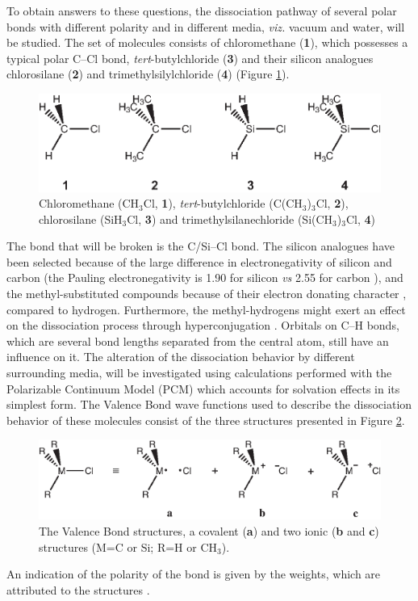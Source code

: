 To obtain answers to these questions, the dissociation pathway of several polar bonds with different polarity and in different media, \textit{viz.} vacuum and water, will be studied.  The set of molecules consists of chloromethane (\textbf{1}), which possesses a typical polar C--Cl bond, \textit{tert}-butylchloride (\textbf{3}) and their silicon analogues chlorosilane (\textbf{2}) and trimethylsilylchloride (\textbf{4}) (Figure \ref{ch3.fig.compounds}).  
\begin{figure}[htbp]
\begin{center}
\includegraphics{dissociation/figures/compounds.eps}
\end{center}
\caption{Chloromethane (CH$_3$Cl, \textbf{1}), \textit{tert}-butylchloride
(C(CH$_3$)$_3$Cl, \textbf{2}), chlorosilane (SiH$_3$Cl, \textbf{3}) and trimethylsilanechloride
(Si(CH$_3$)$_3$Cl, \textbf{4})}
\label{ch3.fig.compounds}
\end{figure} 
The bond that will be broken is the C/Si--Cl bond.  The silicon analogues have been selected because of the large difference in electronegativity of silicon and carbon (the Pauling electronegativity is 1.90 for silicon \textit{vs} 2.55 for carbon \cite{handbook}), and the methyl-substituted compounds because of their electron donating character \cite{mcmurry}, compared to hydrogen. Furthermore, the methyl-hydrogens might exert an effect on the dissociation process through hyperconjugation \cite{march}. Orbitals on C--H bonds, which are several bond lengths separated from the central atom, still have an influence on it. The alteration of the dissociation behavior by different surrounding media, will be investigated using calculations performed with the Polarizable Continuum Model (PCM) \cite{pcm1,pcm2} which accounts for solvation effects in its simplest form.
The Valence Bond wave functions used to describe the dissociation behavior of these molecules consist of the three structures presented in Figure \ref{ch3.fig.structures}.
\begin{figure}[htbp]
\begin{center}
\includegraphics{dissociation/figures/structures.eps}
\end{center}
\caption{The Valence Bond structures, a covalent (\textbf{a}) and two ionic (\textbf{b} and \textbf{c}) structures (M=C or Si; R=H or CH$_3$).}
\label{ch3.fig.structures}
\end{figure}
An indication of the polarity of the bond is given by the weights, which are attributed to the structures \cite{coulson}. 


